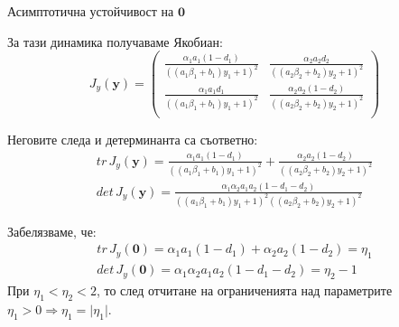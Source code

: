   \begin{frame}[t]{Асимптотична устойчивост на $\mathbf{0}$}

    За тази динамика получаваме Якобиан:
    \[J_{y}(\mathbf{y})=\left(
        \begin{array}{cc}
          \frac{\alpha_{1} a_{1} (1-d_{1})}{((a_{1} \beta_{1} + b_{1}) y_{1} + 1)^2} & \frac{\alpha_{2} a_{2} d_{2}}{((a_{2} \beta_{2} + b_{2}) y_{2} + 1)^2}
          \\
          \frac{\alpha_{1} a_{1} d_{1}}{((a_{1} \beta_{1} + b_{1}) y_{1} + 1)^2} & \frac{\alpha_{2} a_{2} (1-d_{2})}{((a_{2} \beta_{2} + b_{2}) y_{2} + 1)^2}
          \\
        \end{array}
    \right)\]

    Неговите следа и детерминанта са съответно:
    \[
      \begin{array}{c}
        tr \, J_{y}(\mathbf{y}) = \frac{\alpha_{1} a_{1} (1-d_{1})}{((a_{1} \beta_{1} + b_{1}) y_{1} + 1)^2} +  \frac{\alpha_{2} a_{2} (1-d_{2})}{((a_{2} \beta_{2} + b_{2}) y_{2} + 1)^2} \\
        det \, J_{y}(\mathbf{y}) = \frac{\alpha_{1} \alpha_{2} a_{1} a_{2} (1 - d_{1} - d_{2})}
        {((a_{1} \beta_{1} + b_{1}) y_{1} + 1)^2 ((a_{2} \beta_{2} + b_{2}) y_{2} + 1)^2}
    \end{array}\]

    Забелязваме, че:
    \[
      \begin{array}{c}
        tr \, J_{y}(\mathbf{0}) = \alpha_{1} a_{1} (1-d_{1}) + \alpha_{2} a_{2} (1-d_{2}) = \eta_{1} \\
        det \, J_{y}(\mathbf{0}) = \alpha_{1} \alpha_{2} a_{1} a_{2} (1 - d_{1} - d_{2}) =\eta_{2} - 1
    \end{array}\]
    При $\eta_{1} < \eta_{2} < 2$, то след отчитане на ограниченията над параметрите $\eta_{1} > 0  \Rightarrow \eta_{1} = \lvert \eta_{1} \rvert$.

  \end{frame}

